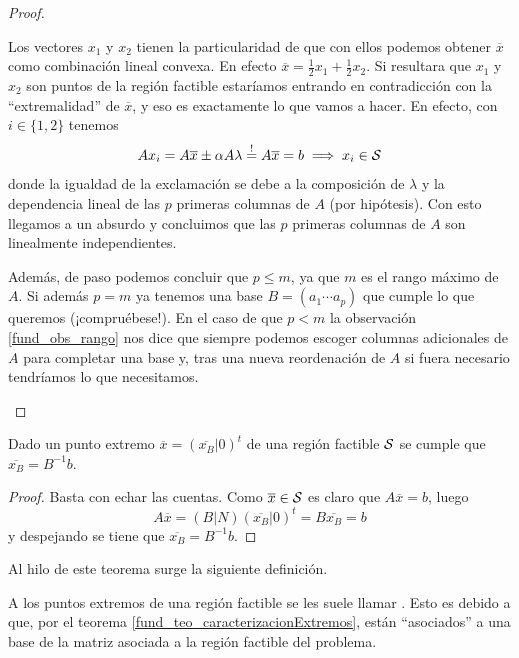 \begin{proof}
\begin{itemize}
		Los vectores $x_1$ y $x_2$ tienen la particularidad de que con ellos podemos obtener $\overline{x}$ como combinación lineal convexa. En efecto $\overline{x}=\frac{1}{2}x_1+\frac{1}{2}x_2$. Si resultara que $x_1$ y $x_2$ son puntos de la región factible estaríamos entrando en contradicción con la ``extremalidad'' de $\overline{x}$, y eso es exactamente lo que vamos a hacer. En efecto, con $i\in\{1,2\}$ tenemos
		\begin{equation*}
			Ax_i=A\overline{x}\pm \alpha A\lambda\stackrel{!}{=}A\overline{x}=b\implies x_i\in\mathcal{S}
		\end{equation*}
		donde la igualdad de la exclamación se debe a la composición de $\lambda$ y la dependencia lineal de las $p$ primeras columnas de $A$ (por hipótesis). Con esto llegamos a un absurdo y concluimos que las $p$ primeras columnas de $A$ son linealmente independientes.
		
		Además, de paso podemos concluir que $p\leq m$, ya que $m$ es el rango máximo de $A$. Si además $p=m$ ya tenemos una base $B=(a_1\cdots a_p)$ que cumple lo que queremos (¡compruébese!). En el caso de que $p<m$ la observación \ref{fund_obs_rango} nos dice que siempre podemos escoger columnas adicionales de $A$ para completar una base y, tras una nueva reordenación de $A$ si fuera necesario tendríamos lo que necesitamos.\qedhere
	\end{itemize}
\end{proof}
\begin{cor}
	Dado un punto extremo $\overline{x}=(\overline{x_B}|0)^t$ de una región factible $\mathcal{S}$ se cumple que $\overline{x_B}=B^{-1}b$.
\end{cor}
\begin{proof}
	Basta con echar las cuentas. Como $\overline{x}\in\mathcal{S}$ es claro que $A\overline{x}=b$, luego
	\begin{equation*}
		A\overline{x}=(B|N)(\overline{x_B}|0)^t=B\overline{x_B}=b
	\end{equation*}
	y despejando se tiene que $\overline{x_B}=B^{-1}b$.
\end{proof}
Al hilo de este teorema surge la siguiente definición.
\begin{defi}
	A los puntos extremos de una región factible se les suele llamar . Esto es debido a que, por el teorema \ref{fund_teo_caracterizacionExtremos}, están ``asociados'' a una base de la matriz asociada a la región factible del problema.
\end{defi}
